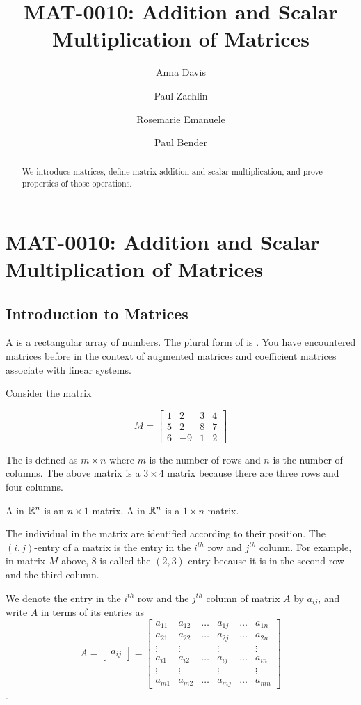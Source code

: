 \documentclass{ximera}
\author{Anna Davis \and Paul Zachlin \and Rosemarie Emanuele \and Paul Bender} \title{MAT-0010:  Addition and Scalar Multiplication of Matrices} \license{CC-BY 4.0}
\begin{document}
\begin{abstract}
  We introduce matrices, define matrix addition and scalar multiplication, and prove properties of those operations.
\end{abstract}
\maketitle

\section*{MAT-0010:  Addition and Scalar Multiplication of Matrices}

\subsection*{Introduction to Matrices}

A  is a rectangular array of numbers. The plural form of  is . You have encountered matrices before in the context of augmented matrices and coefficient matrices associate with linear systems.

Consider the matrix

$$M=\begin{bmatrix}
1 & 2 & 3 & 4 \\
5 & 2 & 8 & 7 \\
6 & -9 & 1 & 2
\end{bmatrix}$$

The  is defined as $m\times n$ where $m$ is the
number of rows and $n$ is the number of columns. The above matrix is a 
$3\times 4$ matrix because there are three rows and four columns.  

A  in $\mathbb{R}^n$ is an $n\times 1$ matrix.  A  in $\mathbb{R}^n$ is a $1\times n$ matrix.  

The individual  in the matrix are identified according to their position. The $( i, j)$-entry of a matrix is the entry 
in the $i^{th}$ row and $j^{th}$ column. For example, in matrix $M$ above,  $8$ is called the $(2,3)$-entry because it is in the second row and the third column. 

We denote the entry in the $i^{th}$ row  and the $j^{th}$ column of matrix $A$ by $a_{ij}$, and write $A$ in terms of its entries
as $$A= \begin{bmatrix} a_{ij} \end{bmatrix}=\begin{bmatrix}
           a_{11} & a_{12}&\dots&a_{1j}&\dots&a_{1n}\\
           a_{21}&a_{22} &\dots&a_{2j}&\dots &a_{2n}\\
		\vdots & \vdots&&\vdots&&\vdots\\
        a_{i1}&a_{i2}&\dots &a_{ij}&\dots &a_{in}\\
        \vdots & \vdots&&\vdots&&\vdots\\
		a_{m1}&a_{m2}&\dots &a_{mj}&\dots &a_{mn}
         \end{bmatrix}$$. 
\end{document}
